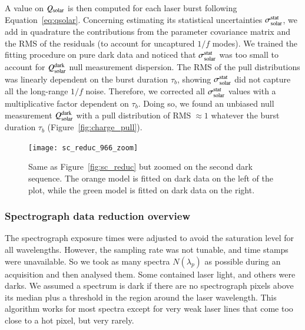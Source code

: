 A value on $Q_{\mathrm{solar}}$ is then computed for each laser burst following Equation~\ref{eq:qsolar}. Concerning estimating its statistical uncertainties $\sigma_{\mathrm{solar}}^{\mathrm{stat}}$, we add in quadrature the contributions from the parameter covariance matrix and the RMS of the residuals (to account for uncaptured $1/f$ modes). We trained the fitting procedure on pure dark data and noticed that $\sigma_{\mathrm{solar}}^{\mathrm{stat}}$ was too small to account for $Q_{\mathrm{solar}}^{\rm dark}$ null measurement dispersion. The RMS of the pull distributions was linearly dependent on the burst duration $\tau_b$, showing $\sigma_{\mathrm{solar}}^{\mathrm{stat}}$ did not capture all the long-range $1/f$ noise. Therefore, we corrected all $\sigma_{\mathrm{solar}}^{\mathrm{stat}}$ values with a multiplicative factor dependent on $\tau_b$. Doing so, we found an unbiased null measurement $Q_{\mathrm{solar}}^{\rm dark}$ with a pull distribution of RMS$\;\approx 1$ whatever the burst duration $\tau_b$ (Figure~\ref{fig:charge_pull}). 

\begin{figure}[!h]
\centering
\texttt{[image: sc\_reduc\_966\_zoom]}
\caption{Same as Figure~\ref{fig:sc_reduc} but zoomed on the second dark sequence. The orange model is fitted on dark data on the left of the plot, while the green model is fitted on dark data on the right.}\label{fig:sc_reduc_zoom}
\end{figure}


\subsubsection{Spectrograph data reduction overview}
\label{sec:spectro_reduction}

The spectrograph exposure times were adjusted to avoid the saturation level for all wavelengths. However, the sampling rate was not tunable, and time stamps were unavailable. So we took as many spectra $N(\lambda_p)$ as possible during an acquisition and then analysed them. Some contained laser light, and others were darks. We assumed a spectrum is dark if there are no spectrograph pixels above its median plus a threshold in the region around the laser wavelength. This algorithm works for most spectra except for very weak laser lines that come too close to a hot pixel, but very rarely.

